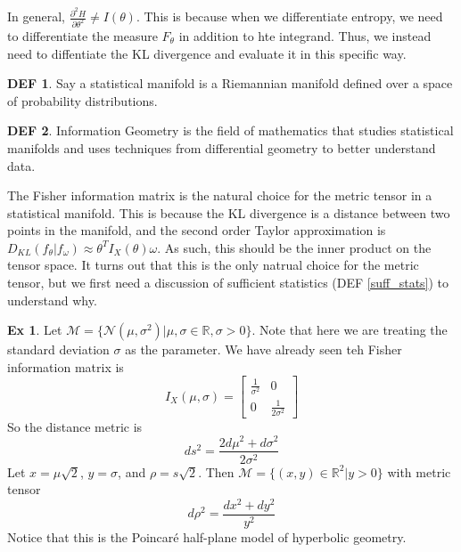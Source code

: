 \documentclass{article}
\theoremstyle{definition}\newtheorem{definition}{DEF}
\theoremstyle{definition}\newtheorem{example}{Ex}
\theoremstyle{lemma}\newtheorem{lemma}{Lemma}
\theoremstyle{corrolary}\newtheorem{corrolary}{Cor}
\begin{document}
In general, $\frac{\partial^2 H}{\partial \theta^2} \neq I(\theta)$.
This is because when we differentiate entropy, we need to differentiate the measure $F_\theta$ in addition to hte integrand.
Thus, we instead need to diffentiate the KL divergence and evaluate it in this specific way.

\begin{definition}
Say a statistical manifold is a Riemannian manifold defined over a space of probability distributions.
\end{definition}

\begin{definition}
Information Geometry is the field of mathematics that studies statistical manifolds and uses techniques from differential geometry to better understand data.
\end{definition}

The Fisher information matrix is the natural choice for the metric tensor in a statistical manifold.
This is because the KL divergence is a distance between two points in the manifold, and the second order Taylor approximation is $D_{KL}(f_\theta | f_\omega) \approx \theta^T I_X(\theta) \omega$.
As such, this should be the inner product on the tensor space.
It turns out that this is the only natrual choice for the metric tensor, but we first need a discussion of sufficient statistics (DEF \ref{suff_stats}) to understand why.

\begin{example}
Let $\mathcal{M}=\{\mathcal{N}(\mu, \sigma^2)|\mu, \sigma \in \mathbb{R}, \sigma > 0\}$.
Note that here we are treating the standard deviation $\sigma$ as the parameter.
We have already seen teh Fisher information matrix is
\begin{equation*}
I_X(\mu, \sigma) = 
\begin{bmatrix}
\frac{1}{\sigma^2} & 0 \\
0 & \frac{1}{2\sigma^2}
\end{bmatrix}
\end{equation*}
So the distance metric is
\begin{equation*}
ds^2 = \frac{2d\mu^2 + d\sigma^2}{2\sigma^2}
\end{equation*}
Let $x=\mu \sqrt{2}$, $y=\sigma$, and $\rho = s\sqrt{2}$.
Then $\mathcal{M}=\{(x,y)\in \mathbb{R}^2 | y>0\}$ with metric tensor
\begin{equation}
d\rho^2 = \frac{dx^2 + dy^2}{y^2}
\end{equation}
Notice that this is the Poincar\'e half-plane model of hyperbolic geometry.
\end{example}
\end{document}
